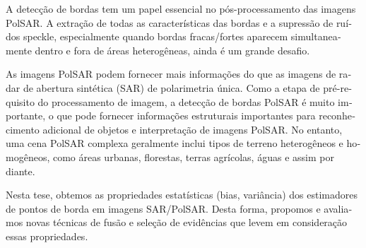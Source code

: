 \begin{otherlanguage}{portuguese} 


\begin{resumo}
{}
A detecção de bordas tem um papel essencial no pós-processamento das imagens PolSAR. A extração de todas as características das bordas e a supressão de ruídos speckle, especialmente quando bordas fracas/fortes aparecem simultaneamente dentro e fora de áreas heterogêneas, ainda é um grande desafio.

As imagens PolSAR podem fornecer mais informações do que as imagens de radar de abertura sintética (SAR) de polarimetria única. Como a etapa de pré-requisito do processamento de imagem, a detecção de bordas PolSAR é muito importante, o que pode fornecer informações estruturais importantes para reconhecimento adicional de objetos e interpretação de imagens PolSAR. No entanto, uma cena PolSAR complexa geralmente inclui tipos de terreno heterogêneos e homogêneos, como áreas urbanas, florestas, terras agrícolas, águas e assim por diante.

Nesta tese, obtemos as propriedades estatísticas (bias, variância) dos estimadores de pontos de borda em imagens SAR/PolSAR. Desta forma, propomos e avaliamos novas técnicas de fusão e seleção de evidências que levem em consideração essas propriedades.

\end{resumo}
\end{otherlanguage}